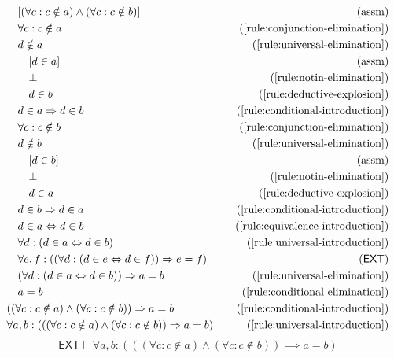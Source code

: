 \begin{align*}
    \assumption[1]{(\forall c: c \notin a) \wedge (\forall c: c \notin b)}\\
    \byrule[1]{\forall c: c \notin a}{\ref{rule:conjunction-elimination}}\\
    \byrule[1]{d \notin a}{\ref{rule:universal-elimination}}\\
    \assumption[2]{d \in a}\\
    \byrule[2]{\bot}{\ref{rule:notin-elimination}}\\
    \byrule[2]{d \in b}{\ref{rule:deductive-explosion}}\\
    \byrule[1]{d \in a \implies d \in b}{\ref{rule:conditional-introduction}}\\
    \byrule[1]{\forall c: c \notin b}{\ref{rule:conjunction-elimination}}\\
    \byrule[1]{d \notin b}{\ref{rule:universal-elimination}}\\
    \assumption[2]{d \in b}\\
    \byrule[2]{\bot}{\ref{rule:notin-elimination}}\\
    \byrule[2]{d \in a}{\ref{rule:deductive-explosion}}\\
    \byrule[1]{d \in b \implies d \in a}{\ref{rule:conditional-introduction}}\\
    \byrule[1]{d \in a \lequiv d \in b}{\ref{rule:equivalence-introduction}}\\
    \byrule[1]{\forall d: (d \in a \lequiv d \in b)}{\ref{rule:universal-introduction}}\\
    \axiom[1]{\forall e, f: ((\forall d: (d \in e \lequiv d \in f)) \implies e = f)}{EXT}\\
    \byrule[1]{(\forall d: (d \in a \lequiv d \in b)) \implies a = b}{\ref{rule:universal-elimination}}\\
    \byrule[1]{a = b}{\ref{rule:conditional-elimination}}\\
    \byrule{((\forall c: c \notin a) \wedge (\forall c: c \notin b)) \implies a = b}{\ref{rule:conditional-introduction}}\\
    \byrule{\forall a, b: (((\forall c: c \notin a) \wedge (\forall c: c \notin b)) \implies a = b)}{\ref{rule:universal-introduction}}
\end{align*}
\begin{equation}
    \mathsf{EXT} \vdash \forall a, b: (((\forall c: c \notin a) \wedge (\forall c: c \notin b)) \implies a = b)
    \label{rule:empty-set-at-most-one}
\end{equation}

